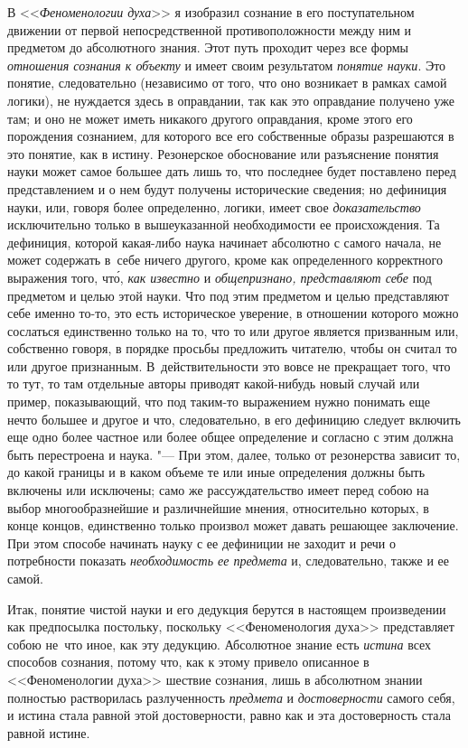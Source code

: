 В <<{\em Феноменологии духа}>> я изобразил сознание в его
поступательном движении от первой непосредственной противоположности между
ним и предметом до абсолютного знания. Этот путь проходит через все формы
{\em отношения сознания к объекту} и имеет своим
результатом {\em понятие науки}. Это понятие,
следовательно (независимо от того, что оно возникает в рамках самой
логики), не нуждается здесь в оправдании, так как это оправдание получено
уже там; и оно не может иметь никакого другого оправдания, кроме этого его
порождения сознанием, для которого все его собственные образы разрешаются в
это понятие, как в истину. Резонерское обоснование или разъяснение
понятия науки может самое большее дать лишь то, что последнее будет
поставлено перед представлением и о нем будут получены исторические
сведения; но дефиниция науки, или, говоря более определенно, логики, имеет
свое {\em доказательство} исключительно только в
вышеуказанной необходимости ее происхождения. Та дефиниция, которой
какая-либо наука начинает абсолютно с самого начала, не может содержать в~себе
ничего другого, кроме как определенного корректного выражения того,
чт\'{о}, {\em как известно} и {\em общепризнано, представляют себе}
под предметом и целью этой
науки. Что под этим предметом и целью представляют себе именно то-то, это
есть историческое уверение, в отношении которого можно сослаться
единственно только на то, что то или другое является призванным или,
собственно говоря, в порядке просьбы предложить читателю, чтобы он считал
то или другое признанным. В~действительности это вовсе не прекращает того,
что то тут, то там отдельные авторы приводят какой-нибудь новый случай или
пример, показывающий, что под таким-то выражением нужно понимать еще нечто
большее и другое и что, следовательно, в его дефиницию следует включить еще
одно более частное или более общее определение и согласно с этим должна
быть перестроена и наука. "--- При этом, далее, только от резонерства
зависит то, до какой границы и в каком объеме те или иные определения
должны быть включены или исключены; само же рассуждательство имеет перед
собою на выбор многообразнейшие и различнейшие мнения, относительно
которых, в конце концов, единственно только произвол может давать решающее
заключение. При этом способе начинать науку с ее дефиниции не заходит и
речи о потребности показать {\em необходимость ее
предмета} и, следовательно, также и ее самой.

Итак, понятие чистой науки и его дедукция берутся в настоящем произведении
как предпосылка постольку, поскольку <<Феноменология духа>> представляет
собою не~что иное, как эту дедукцию. Абсолютное знание есть
{\em истина} всех способов сознания, потому что, как к
этому привело описанное в <<Феноменологии духа>> шествие сознания, лишь в
абсолютном знании полностью растворилась разлученность
{\em предмета} и {\em достоверности} самого себя, и истина стала равной
этой достоверности, равно как и эта достоверность стала равной истине.


